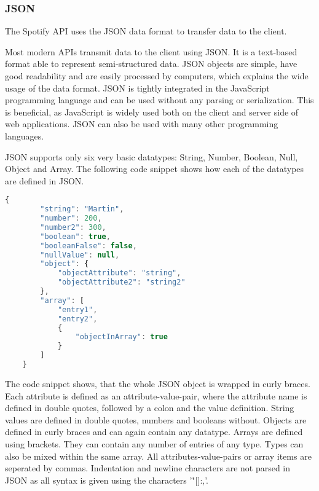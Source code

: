 \subsubsection{JSON}

The Spotify API uses the \ac{JSON} data format to transfer data to the client\cite{SpotifyWebAPI}.

Most modern APIs transmit data to the client using \ac{JSON}.
It is a text-based format able to represent semi-structured data. \cite{MozillaJSON}
JSON objects are simple, have good readability and are easily processed by computers,
which explains the wide usage of the data format\cite{OracleJSON}.
JSON is tightly integrated in the JavaScript programming language and can be used without any parsing or serialization.\cite{OracleJSON}
This is beneficial, as JavaScript is widely used both on the client and server side of web applications. 
JSON can also be used with many other programming languages. \cite{JsonOrgIntroduction}

JSON supports only six very basic datatypes: String, Number, Boolean, Null, Object and Array.\cite{OracleJSON}
The following code snippet shows how each of the datatypes are defined in JSON.

\begin{lstlisting}[language=JavaScript]
    {
        "string": "Martin",
        "number": 200,
        "number2": 300,
        "boolean": true,
        "booleanFalse": false,
        "nullValue": null,
        "object": {
            "objectAttribute": "string",
            "objectAttribute2": "string2"
        },
        "array": [
            "entry1",
            "entry2",
            {
                "objectInArray": true
            }
        ]
    }
\end{lstlisting}

The code snippet shows, that the whole JSON object is wrapped in curly braces.
Each attribute is defined as an attribute-value-pair, where the attribute name is defined in 
double quotes, followed by a colon and the value definition. String values are defined in 
double quotes, numbers and booleans without. Objects are defined in curly braces and can
again contain any datatype.
Arrays are defined using brackets. They can contain any number of entries of any type.
Types can also be mixed within the same array.
All attributes-value-pairs or array items are seperated by commas.
Indentation and newline characters are not parsed in JSON as all syntax is given using
the characters '"{}[]:,'.\cite{JsonOrgIntroduction}

